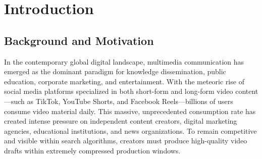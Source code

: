 \documentclass[a4paper,12pt]{report}
\begin{document}
\tableofcontents
\newpage
\listoffigures
\newpage
\listoftables
\newpage

\chapter{Introduction}
\label{ch:intro}

\section{Background and Motivation}
In the contemporary global digital landscape, multimedia communication has emerged as the dominant paradigm for knowledge dissemination, public education, corporate marketing, and entertainment. With the meteoric rise of social media platforms specialized in both short-form and long-form video content—such as TikTok, YouTube Shorts, and Facebook Reels—billions of users consume video material daily. This massive, unprecedented consumption rate has created intense pressure on independent content creators, digital marketing agencies, educational institutions, and news organizations. To remain competitive and visible within search algorithms, creators must produce high-quality video drafts within extremely compressed production windows.
\end{document}
